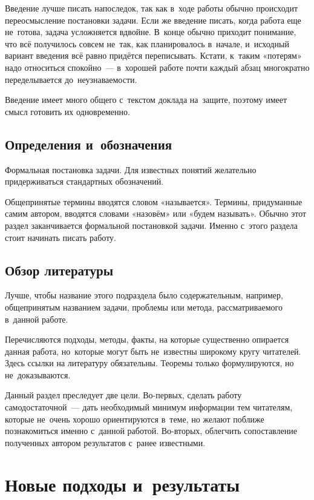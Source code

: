 \documentclass[12pt,fleqn]{article}
\begin{document}
Введение лучше писать напоследок, так как в~ходе работы обычно
происходит переосмысление постановки задачи.  Если же введение писать,
когда работа еще не~готова, задача усложняется вдвойне.  В~конце
обычно приходит понимание, что всё получилось совсем не~так, как
планировалось в~начале, и~исходный вариант введения всё равно придётся
переписывать.  Кстати, к~таким «потерям» надо относиться спокойно~---
в~хорошей работе почти каждый абзац многократно переделывается
до~неузнаваемости.

Введение имеет много общего с~текстом доклада на~защите, поэтому имеет
смысл готовить их одновременно.

\subsection{Определения и~обозначения}

Формальная постановка задачи. Для известных понятий желательно
придерживаться стандартных обозначений.

Общепринятые термины вводятся словом «называется». Термины,
придуманные самим автором, вводятся словами «назовём» или «будем
называть».  Обычно этот раздел заканчивается формальной постановкой
задачи.  Именно с~этого раздела стоит начинать писать работу.

\subsection{Обзор литературы}

Лучше, чтобы название этого подраздела было содержательным, например,
общепринятым названием задачи, проблемы или метода, рассматриваемого
в~данной работе.

Перечисляются подходы, методы, факты, на которые существенно опирается
данная работа, но~которые могут быть не~известны широкому кругу
читателей.  Здесь ссылки на литературу обязательны.  Теоремы только
формулируются, но не~доказываются.

Данный раздел преследует две цели.  Во-первых, сделать работу
самодостаточной~--- дать необходимый минимум информации тем читателям,
которые не~очень хорошо ориентируются в~теме, но желают поближе
познакомиться именно с~данной работой.  Во-вторых, облегчить
сопоставление полученных автором результатов с~ранее известными.

\section{Новые подходы и~результаты}
\end{document}

